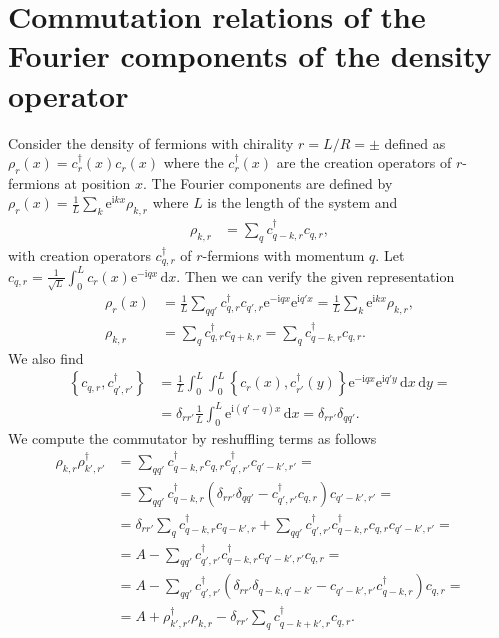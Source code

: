 \documentclass[english, parskip=full]{scrartcl}
\title{\titel}
\author{\autor}
\date{\today}
\renewcommand{\i}{\text{i}}
\newcommand{\e}{\text{e}}
\begin{document}
\maketitle  %

\section{Commutation relations of the Fourier components of the density operator}
Consider the density of fermions with chirality $r=L/R=\pm$ defined as $\rho_r(x) = c_r^\dagger(x) c_r(x)$ where the $c_r^\dagger(x)$ are the creation operators of $r$-fermions at position $x$.
The Fourier components are defined by $\rho_r(x) = \frac{1}{L} \sum_k \e^{\i kx}\rho_{k,r}$ where $L$ is the length of the system and
\begin{align}
\rho_{k,r} &= \sum_q c^\dagger_{q-k,r}c_{q,r},
\end{align}
with creation operators $c^\dagger_{q,r}$ of $r$-fermions with momentum $q$.
Let $c_{q,r} = \frac{1}{\sqrt{L}} \int_{0}^{L} c_r(x) \e^{-\i qx} \, \mathrm{d}x$.
Then we can verify the given representation
\begin{align}
\rho_r(x) &= \frac{1}{L} \sum_{qq'} c_{q,r}^\dagger c_{q',r} \e^{-\i qx}\e^{\i q'x} = \frac{1}{L} \sum_k \e^{\i kx} \rho_{k,r},\\
\rho_{k,r} &= \sum_q c^\dagger_{q,r} c_{q+k,r} = \sum_{q} c^\dagger_{q-k,r} c_{q,r}.
\end{align}
We also find
\begin{align}
\left\{ c_{q,r} , c_{q',r'}^\dagger  \right\} &= \frac{1}{L} \int_{0}^{L} \int_{0}^{L} \left\{ c_r(x), c_{r'}^\dagger(y) \right\} \e^{-\i qx} \e^{\i q'y} \, \mathrm{d}x \, \mathrm{d}y  = \\
&= \delta_{rr'} \frac{1}{L} \int_{0}^{L} \e^{\i (q' - q) x} \, \mathrm{d}x = \delta_{rr'} \delta_{qq'}.
\end{align}
We compute the commutator by reshuffling terms as follows
\begin{align}
 \rho_{k,r} \rho^\dagger_{k',r'} &= \sum_{qq'} c^\dagger_{q-k,r} c_{q,r} c^\dagger_{q',r'} c_{q'-k',r'} = \\
 &= \sum_{qq'} c^\dagger_{q-k,r} \left( \delta_{rr'} \delta_{qq'} - c^\dagger_{q',r'} c_{q,r} \right) c_{q'-k',r'} = \\
 &= \delta_{rr'} \sum_{q} c^\dagger_{q-k,r} c_{q-k',r} + \sum_{qq'} c^\dagger_{q',r'} c^\dagger_{q-k,r} c_{q,r} c_{q'-k',r'} = \\
 &= A - \sum_{qq'} c^\dagger_{q',r'} c^\dagger_{q-k,r} c_{q'-k',r'} c_{q,r} = \\
 &= A - \sum_{qq'} c^\dagger_{q',r'} \left( \delta_{rr'} \delta_{q-k, q'-k'} - c_{q'-k',r'} c^\dagger_{q-k,r} \right) c_{q,r} = \\
 &= A + \rho_{k',r'}^\dagger \rho_{k,r} - \delta_{rr'} \sum_{q} c^\dagger_{q-k+k',r} c_{q,r}.
\end{align}
\end{document}
